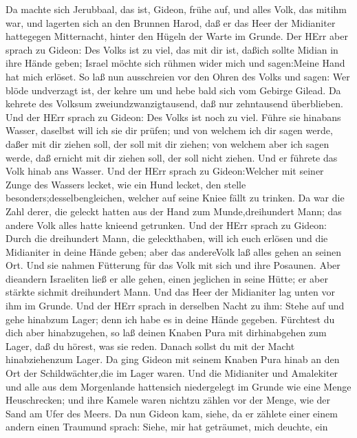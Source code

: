  Da machte sich Jerubbaal, das ist, Gideon, frühe auf, und
alles Volk, das mitihm war, und lagerten sich an den Brunnen Harod, daß
er das Heer der Midianiter hattegegen Mitternacht, hinter den Hügeln der
Warte im Grunde.  Der HErr aber sprach zu Gideon: Des Volks
ist zu viel, das mit dir ist, daßich sollte Midian in ihre Hände geben;
Israel möchte sich rühmen wider mich und sagen:Meine Hand hat mich
erlöset.  So laß nun ausschreien vor den Ohren des Volks und
sagen: Wer blöde undverzagt ist, der kehre um und hebe bald sich vom
Gebirge Gilead. Da kehrete des Volksum zweiundzwanzigtausend, daß nur
zehntausend überblieben.  Und der HErr sprach zu Gideon: Des
Volks ist noch zu viel. Führe sie hinabans Wasser, daselbst will ich sie
dir prüfen; und von welchem ich dir sagen werde, daßer mit dir ziehen
soll, der soll mit dir ziehen; von welchem aber ich sagen werde, daß
ernicht mit dir ziehen soll, der soll nicht ziehen.  Und er
führete das Volk hinab ans Wasser. Und der HErr sprach zu Gideon:Welcher
mit seiner Zunge des Wassers lecket, wie ein Hund lecket, den stelle
besonders;desselbengleichen, welcher auf seine Kniee fällt zu trinken.
 Da war die Zahl derer, die geleckt hatten aus der Hand zum
Munde,dreihundert Mann; das andere Volk alles hatte knieend getrunken.
 Und der HErr sprach zu Gideon: Durch die dreihundert Mann,
die geleckthaben, will ich euch erlösen und die Midianiter in deine
Hände geben; aber das andereVolk laß alles gehen an seinen Ort.
 Und sie nahmen Fütterung für das Volk mit sich und ihre
Posaunen. Aber dieandern Israeliten ließ er alle gehen, einen jeglichen
in seine Hütte; er aber stärkte sichmit dreihundert Mann. Und das Heer
der Midianiter lag unten vor ihm im Grunde.  Und der HErr
sprach in derselben Nacht zu ihm: Stehe auf und gehe hinabzum Lager;
denn ich habe es in deine Hände gegeben.  Fürchtest du dich
aber hinabzugehen, so laß deinen Knaben Pura mit dirhinabgehen zum
Lager,  daß du hörest, was sie reden. Danach sollst du mit
der Macht hinabziehenzum Lager. Da ging Gideon mit seinem Knaben Pura
hinab an den Ort der Schildwächter,die im Lager waren.  Und
die Midianiter und Amalekiter und alle aus dem Morgenlande hattensich
niedergelegt im Grunde wie eine Menge Heuschrecken; und ihre Kamele
waren nichtzu zählen vor der Menge, wie der Sand am Ufer des Meers.
 Da nun Gideon kam, siehe, da er zählete einer einem andern
einen Traumund sprach: Siehe, mir hat geträumet, mich deuchte, ein
